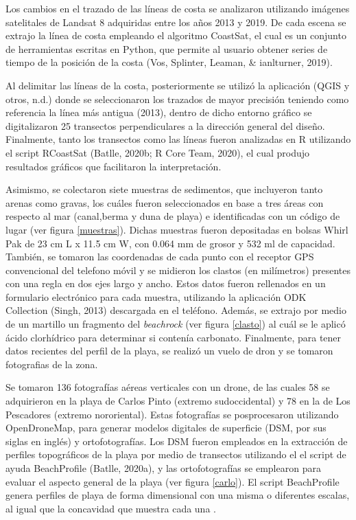\documentclass[11pt,]{article}
\begin{document}
Los cambios en el trazado de las líneas de costa se analizaron
utilizando imágenes satelitales de Landsat 8 adquiridas entre los años
2013 y 2019. De cada escena se extrajo la línea de costa empleando el
algoritmo CoastSat, el cual es un conjunto de herramientas escritas en
Python, que permite al usuario obtener series de tiempo de la posición
de la costa (Vos, Splinter, Leaman, \& ianlturner, 2019).

Al delimitar las líneas de la costa, posteriormente se utilizó la
aplicación (QGIS y otros, n.d.) donde se seleccionaron los trazados de
mayor precisión teniendo como referencia la línea más antigua (2013),
dentro de dicho entorno gráfico se digitalizaron 25 transectos
perpendiculares a la dirección general del diseño. Finalmente, tanto los
transectos como las líneas fueron analizadas en R utilizando el script
RCoastSat (Batlle, 2020b; R Core Team, 2020), el cual produjo resultados
gráficos que facilitaron la interpretación.

Asimismo, se colectaron siete muestras de sedimentos, que incluyeron
tanto arenas como gravas, los cuáles fueron seleccionados en base a tres
áreas con respecto al mar (canal,berma y duna de playa) e identificadas
con un código de lugar (ver figura \ref{muestras}). Dichas muestras
fueron depositadas en bolsas Whirl Pak de 23 cm L x 11.5 cm W, con 0.064
mm de grosor y 532 ml de capacidad. También, se tomaron las coordenadas
de cada punto con el receptor GPS convencional del telefono móvil y se
midieron los clastos (en milímetros) presentes con una regla en dos ejes
largo y ancho. Estos datos fueron rellenados en un formulario
electrónico para cada muestra, utilizando la aplicación ODK Collection
(Singh, 2013) descargada en el teléfono. Además, se extrajo por medio de
un martillo un fragmento del \emph{beachrock} (ver figura \ref{clasto})
al cuál se le aplicó ácido clorhídrico para determinar si contenía
carbonato. Finalmente, para tener datos recientes del perfil de la
playa, se realizó un vuelo de dron y se tomaron fotografias de la zona.

Se tomaron 136 fotografías aéreas verticales con un drone, de las cuales
58 se adquirieron en la playa de Carlos Pinto (extremo sudoccidental) y
78 en la de Los Pescadores (extremo nororiental). Estas fotografías se
posprocesaron utilizando OpenDroneMap, para generar modelos digitales de
superficie (DSM, por sus siglas en inglés) y ortofotografías. Los DSM
fueron empleados en la extracción de perfiles topográficos de la playa
por medio de transectos utilizando el el script de ayuda BeachProfile
(Batlle, 2020a), y las ortofotografías se emplearon para evaluar el
aspecto general de la playa (ver figura \ref{carlo}). El script
BeachProfile genera perfiles de playa de forma dimensional con una misma
o diferentes escalas, al igual que la concavidad que muestra cada una .
\end{document}
